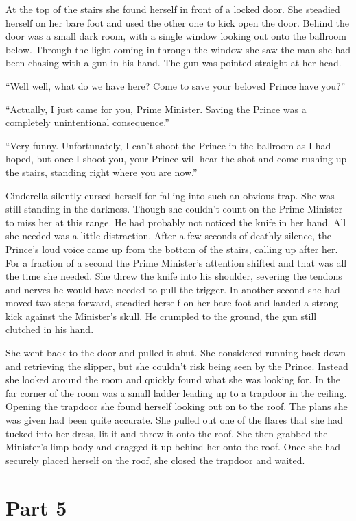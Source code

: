 \documentclass[12pt,letterpaper]{article}
\begin{document}
At the top of the stairs she found herself in front of a locked door. She steadied herself on her bare foot and used the other one to kick open the door. Behind the door was a small dark room, with a single window looking out onto the ballroom below. Through the light coming in through the window she saw the man she had been chasing with a gun in his hand. The gun was pointed straight at her head.

``Well well, what do we have here? Come to save your beloved Prince have you?''

``Actually, I just came for you, Prime Minister. Saving the Prince was a completely unintentional consequence.''

``Very funny. Unfortunately, I can't shoot the Prince in the ballroom as I had hoped, but once I shoot you, your Prince will hear the shot and come rushing up the stairs, standing right where you are now.''

Cinderella silently cursed herself for falling into such an obvious trap. She was still standing in the darkness. Though she couldn't count on the Prime Minister to miss her at this range. He had probably not noticed the knife in her hand. All she needed was a little distraction. After a few seconds of deathly silence, the Prince's loud voice came up from the bottom of the stairs, calling up after her. For a fraction of a second the Prime Minister's attention shifted and that was all the time she needed. She threw the knife into his shoulder, severing the tendons and nerves he would have needed to pull the trigger. In another second she had moved two steps forward, steadied herself on her bare foot and landed a strong kick against the Minister's skull. He crumpled to the ground, the gun still clutched in his hand.

She went back to the door and pulled it shut. She considered running back down and retrieving the slipper, but she couldn't risk being seen by the Prince. Instead she looked around the room and quickly found what she was looking for. In the far corner of the room was a small ladder leading up to a trapdoor in the ceiling. Opening the trapdoor she found herself looking out on to the roof. The plans she was given had been quite accurate. She pulled out one of the flares that she had tucked into her dress, lit it and threw it onto the roof. She then grabbed the Minister's limp body and dragged it up behind her onto the roof. Once she had securely placed herself on the roof, she closed the trapdoor and waited.

\section*{Part 5}
\end{document}
